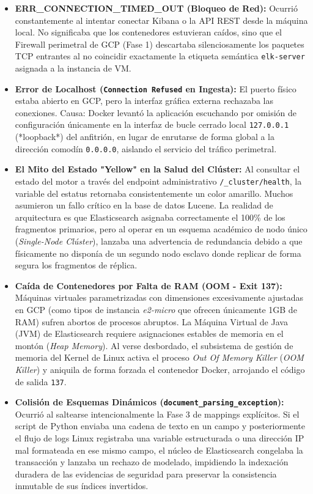 \documentclass[
  coursetitle={Cómputo Nube y Tecnologías Emergentes},
  coursehours={96},
  coursedate={Verano 2026},
  doctype={Práctica},
  otherlangs={english,french},
  authorname={Lázaro},
  authorsurname={Bustio-Martínez},
  authortitle={PhD},
  role={Profesor Investigador},
  email={lbustio@inaoe.mx},
  phone={5559504000},
  ext={7459},
  institution={Instituto Nacional de Astrofísica, Óptica y Electrónica (INAOE)},
  department={Maestría en Ciencias en Tecnologías de Seguridad},
  address={Luis Enrique Erro 1, Sta. Ma. Tonantzintla, San Andrés Cholula, CP 72840, Puebla, México},
  margin={0.5in}
]{../../lbustio_lecture_notes}
\begin{document}
\begin{itemize}
    \item \textbf{ERR\_CONNECTION\_TIMED\_OUT (Bloqueo de Red):} Ocurrió constantemente al intentar conectar Kibana o la API REST desde la máquina local. No significaba que los contenedores estuvieran caídos, sino que el Firewall perimetral de GCP (Fase 1) descartaba silenciosamente los paquetes TCP entrantes al no coincidir exactamente la etiqueta semántica \texttt{elk-server} asignada a la instancia de VM.
    \item \textbf{Error de Localhost (\texttt{Connection Refused} en Ingesta):} El puerto físico estaba abierto en GCP, pero la interfaz gráfica externa rechazaba las conexiones. Causa: Docker levantó la aplicación escuchando por omisión de configuración únicamente en la interfaz de bucle cerrado local \texttt{127.0.0.1} (*loopback*) del anfitrión, en lugar de enrutarse de forma global a la dirección comodín \texttt{0.0.0.0}, aislando el servicio del tráfico perimetral.
    \item \textbf{El Mito del Estado "Yellow" en la Salud del Clúster:} Al consultar el estado del motor a través del endpoint administrativo \texttt{/\_cluster/health}, la variable del estatus retornaba consistentemente un color amarillo. Muchos asumieron un fallo crítico en la base de datos Lucene. La realidad de arquitectura es que Elasticsearch asignaba correctamente el 100\% de los fragmentos primarios, pero al operar en un esquema académico de nodo único (\textit{Single-Node Clúster}), lanzaba una advertencia de redundancia debido a que físicamente no disponía de un segundo nodo esclavo donde replicar de forma segura los fragmentos de réplica.
    \item \textbf{Caída de Contenedores por Falta de RAM (OOM - Exit 137):} Máquinas virtuales parametrizadas con dimensiones excesivamente ajustadas en GCP (como tipos de instancia \textit{e2-micro} que ofrecen únicamente 1GB de RAM) sufren abortos de procesos abruptos. La Máquina Virtual de Java (JVM) de Elasticsearch requiere asignaciones estables de memoria en el montón (\textit{Heap Memory}). Al verse desbordado, el subsistema de gestión de memoria del Kernel de Linux activa el proceso \textit{Out Of Memory Killer} (\textit{OOM Killer}) y aniquila de forma forzada el contenedor Docker, arrojando el código de salida \texttt{137}.
    \item \textbf{Colisión de Esquemas Dinámicos (\texttt{document\_parsing\_exception}):} Ocurrió al saltearse intencionalmente la Fase 3 de mappings explícitos. Si el script de Python enviaba una cadena de texto en un campo y posteriormente el flujo de logs Linux registraba una variable estructurada o una dirección IP mal formateada en ese mismo campo, el núcleo de Elasticsearch congelaba la transacción y lanzaba un rechazo de modelado, impidiendo la indexación duradera de las evidencias de seguridad para preservar la consistencia inmutable de sus índices invertidos.
\end{itemize}
\end{document}
